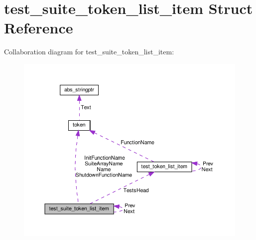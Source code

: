 \hypertarget{structtest__suite__token__list__item}{}\section{test\+\_\+suite\+\_\+token\+\_\+list\+\_\+item Struct Reference}
\label{structtest__suite__token__list__item}


Collaboration diagram for test\+\_\+suite\+\_\+token\+\_\+list\+\_\+item\+:\nopagebreak
\begin{figure}[H]
\begin{center}
\leavevmode
\includegraphics[width=350pt]{da/d06/structtest__suite__token__list__item__coll__graph}
\end{center}
\end{figure}
